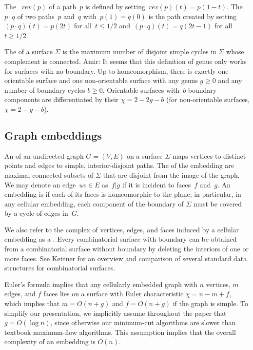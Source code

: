 \documentclass[letterpaper,review]{siamart190516}
\def\rev{\mathit{rev}}
\def\anote#1{\color{purple}Amir: #1 \color{black}}
\begin{document}
The ~$\rev(p)$ of a path~$p$ is defined by
setting~$\rev(p)(t) = p(1-t)$. The ~$p \cdot q$ of two
paths~$p$ and~$q$ with~$p(1)=q(0)$ is the path created by
setting~$(p\cdot q)(t) = p(2t)$ for all~$t \leq 1/2$
and~$(p\cdot q)(t) = q(2t-1)$ for all~$t \geq 1/2$.

The  of a surface $\Sigma$ is the maximum number of disjoint simple cycles in $\Sigma$ whose complement is connected.
\anote{It seems that this definition of genus only works for surfaces with no boundary.}
 Up to homeomorphism,
there is exactly one orientable surface and one non-orientable surface with any genus $g\ge 0$ and any number of
boundary cycles $b\ge 0$.
Orientable surfaces with~$b$ boundary components are differentiated by their  ${\chi = 2 - 2g - b}$ (for non-orientable surfaces, ${\chi = 2 - g - b}$).


\subsection{Graph embeddings}
\label{SS:embeddings}


An  of an undirected graph $G=(V,E)$ on a surface $\Sigma$ maps vertices to distinct points and edges to simple, interior-disjoint paths.  The  of the embedding are maximal connected subsets of $\Sigma$ that are disjoint from the image of the graph.
We may denote an edge~$uv \in E$ as~$f | g$ if it is incident to faces~$f$ and~$g$.
An embedding is  if each of its faces is homeomorphic to the plane; in particular, in any cellular embedding, each component of the boundary of $\Sigma$ must be covered by a cycle of edges in~$G$.  

We also refer to the complex of vertices, edges, and faces induced by a cellular embedding as a .  Every combinatorial surface with boundary can be obtained from a combinatorial surface without boundary by deleting the interiors of one or more faces.  See Kettner \cite{k-ugpdd-99} for an overview and comparison of several standard data structures for combinatorial surfaces. 

Euler's formula implies that any cellularly embedded graph with $n$ vertices, $m$ edges, and $f$ faces lies on a surface with Euler characteristic $\chi = n-m+f$, which implies that $m = O(n+g)$ and $f=O(n+g)$ if the graph is simple.
To simplify our presentation, we implicitly assume throughout the paper that $g = O(\log n)$, since otherwise our minimum-cut algorithms are slower than textbook maximum-flow algorithms.  This assumption implies that the overall complexity of an embedding is $O(n)$.
\end{document}
